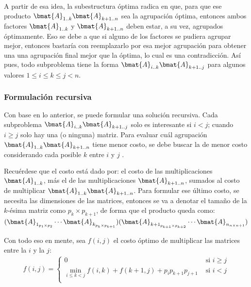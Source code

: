 A partir de esa idea, la subestructura óptima radica en que, para que ese producto $\bmat{A}_{1..k} \bmat{A}_{k+1..n}$ sea la agrupación óptima, entonces ambos factores $\bmat{A}_{1..k}$ y $\bmat{A}_{k+1..n}$ deben estar, a su vez, agrupados óptimamente. Eso se debe a que si alguno de los factores se pudiera agrupar mejor, entonces bastaría con reemplazarlo por esa mejor agrupación para obtener una una agrupación final mejor que la óptima, lo cual es una contradicción. Así pues, todo subproblema tiene la forma $\bmat{A}_{i..k} \bmat{A}_{k+1..j}$ para algunos valores $1 \leq i\leq k\leq j < n$.

\subsubsection{Formulación recursiva}

Con base en lo anterior, se puede formular una solución recursiva. Cada subproblema $\bmat{A}_{i..k} \bmat{A}_{k+1..j}$ solo es interesante si $i < j$; cuando $i \geq j$ solo hay una (o ninguna) matriz. Para evaluar cuál agrupación $\bmat{A}_{1..k} \bmat{A}_{k+1..n}$ tiene menor costo, se debe buscar la de menor costo considerando cada posible $k$ entre $i$ y $j$ .

Recuérdese que el costo está dado por: el costo de las multiplicaciones $\bmat{A}_{1..k}$, más el de las multiplicaciones $\bmat{A}_{k+1..n}$, sumados al costo de multiplicar $\bmat{A}_{1..k} \bmat{A}_{k+1..n}$. Para formular ese último costo, se necesita las dimensiones de las matrices, entonces se va a denotar el tamaño de la $k$-ésima matriz como $p_k \times p_{k+1}$, de forma que el producto queda como: $(\bmat{A}_{1_{p_1 \times p_2}} \cdots \bmat{A}_{k_{p_k \times p_{k+1}}})(\bmat{A}_{{k+1}_{p_{k+1} \times p_{k+2}}}\cdots \bmat{A}_{n_{n\times n+1}})$

Con todo eso en mente, sea $f(i,j)$ el costo óptimo de multiplicar las matrices entre la $i$ y la $j$:
\begin{gather*}
f(i,j) = \begin{cases}
  0 & \text{ si } i \geq j \\ 
  \min\limits_{i \leq k < j} f(i, k) + f(k+1, j) + p_ip_{k+1}p_{j+1} & \text{ si } i < j \\ 
\end{cases}
\end{gather*}